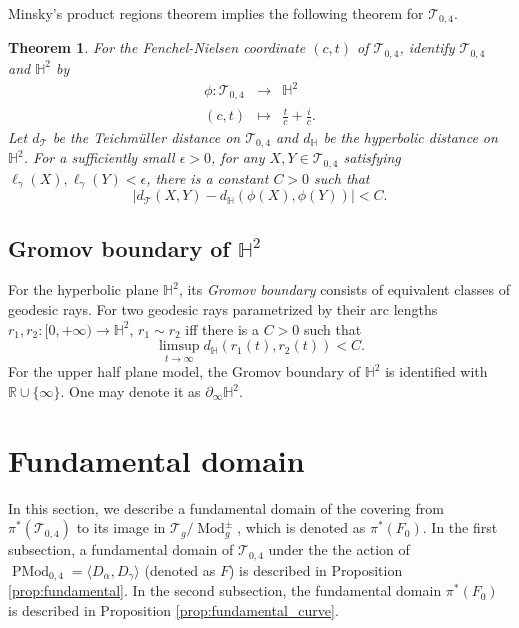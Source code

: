 \documentclass[UTF8]{amsart}
\newtheorem{theorem}{Theorem}[section]
\numberwithin{equation}{section}
\theoremstyle{definition}
\theoremstyle{example}
\theoremstyle{remark}
\DeclareMathOperator{\pmodo}{PMod}
\DeclareMathOperator{\modo}{Mod}
\begin{document}
Minsky's product regions theorem \cite[Theorem 6.1]{minsky1996extremal} implies the following theorem for $\mathcal{T}_{0,4}$. 

\begin{theorem}
 For the Fenchel-Nielsen coordinate $(c,t)$ of $\mathcal{T}_{0,4}$, identify $\mathcal{T}_{0,4}$ and $\mathbb{H}^2$ by 
 \begin{eqnarray*}
  \phi:\mathcal{T}_{0,4} & \to & \mathbb{H}^2 \\
  (c,t) &\mapsto&   \frac{t}{c} + \frac{i}{c}. 
 \end{eqnarray*}
 Let $d_{\mathcal{T}}$ be the Teichm\"uller distance on $\mathcal{T}_{0,4}$ and $d_{\mathbb{H}}$ be the hyperbolic distance on $\mathbb{H}^2$. For a sufficiently small $\epsilon >0$, for any $X, Y \in \mathcal{T}_{0,4}$ satisfying $\ell_{\gamma}(X), \ell_{\gamma}(Y) < \epsilon$, there is a constant $C >0$ such that
 \[
 |d_{\mathcal{T}}(X,Y) - d_{\mathbb{H}}(\phi(X), \phi(Y))| < C. 
 \]
 \label{thm:minsky}
\end{theorem}

\subsection{Gromov boundary of $\mathbb{H}^2$}
For the hyperbolic plane $\mathbb{H}^2$, its \emph{Gromov boundary} consists of equivalent classes of geodesic rays. For two geodesic rays parametrized by their arc lengths $r_1, r_2: [0,+\infty)\to \mathbb{H}^2$, $r_1\sim r_2$ iff there is a $C>0$ such that 
\[
 \limsup\limits_{t\to \infty} d_{\mathbb{H}}(r_1(t), r_2(t)) <C. 
\]
For the upper half plane model, the Gromov boundary of $\mathbb{H}^2$ is identified with $\mathbb{R}\cup \{\infty\}$. One may denote it as $\partial_{\infty} \mathbb{H}^2$. 

\section{Fundamental domain}
\label{sec:fund_dom}
In this section, we describe a fundamental domain of the covering from $\pi^{*}(\mathcal{T}_{0,4})$ to its image in $\mathcal{T}_g/\modo_g^{\pm}$, which is denoted as $\pi^{*}(F_0)$. In the first subsection, a fundamental domain of $\mathcal{T}_{0,4}$ under the the action of $\pmodo_{0,4}=\langle D_{\alpha}, D_{\gamma} \rangle$ (denoted as $F$) is described in Proposition \ref{prop:fundamental}. In the second subsection, the fundamental domain $\pi^{*}(F_0)$ is described in Proposition \ref{prop:fundamental_curve}. 
\end{document}
